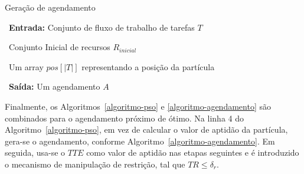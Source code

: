 \documentclass[sigconf]{acmart}
\begin{document}
\begin{algorithm}
	\caption{Geração de agendamento}
	\ {\textbf{Entrada:} Conjunto de fluxo de trabalho de tarefas $ T $}
	
	\ {Conjunto Inicial de recursos $ R_{inicial} $}
	
	\ {Um array  $pos[{\left| T \right|}]$ representando a posição da partícula}
	
	\ {\textbf{Saída:} Um agendamento $ A $}
	
	\begin{algorithmic}[1]
		
		 
		\Else
		\State {$ TIni_{t_i} = (\max {\{TFin_{t_{pai}}:t_{pai}[ \in pais(t_i) \}},TFin_{r_{pos[i]}}) $}	
		\EndIf
		\EndIf	
		\EndFor
		\EndIf
		\EndFor 
	\end{algorithmic}
	\label{algoritmo-agendamento}
\end{algorithm}
Finalmente, os Algoritmos~\ref{algoritmo-pso} e \ref{algoritmo-agendamento} são combinados para o agendamento próximo de ótimo. Na linha 4 do Algoritmo~\ref{algoritmo-pso}, em vez de calcular o valor de aptidão da partícula, gera-se o agendamento, conforme Algoritmo~\ref{algoritmo-agendamento}. Em seguida, usa-se o $ TTE $ como valor de aptidão nas etapas seguintes e é introduzido o mecanismo de manipulação de restrição, tal que  ${TR \le {\delta _r}} $.  
% 	
\end{document}
